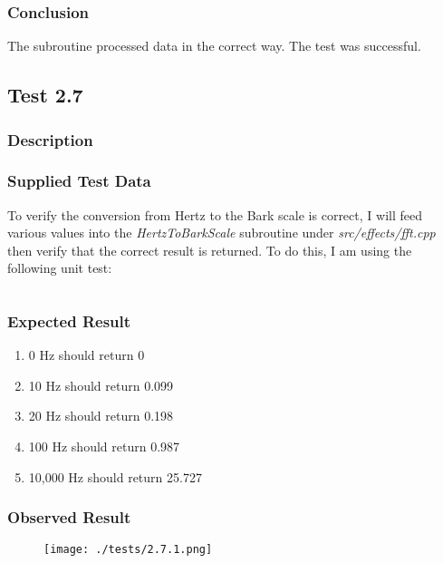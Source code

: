 \subsubsection*{Conclusion}
The subroutine processed data in the correct way. The test was successful.


\subsection{Test 2.7}
\subsubsection*{Description}
\paragraph{}
{
	\centering
}

\subsubsection*{Supplied Test Data}
To verify the conversion from Hertz to the Bark scale is correct, I will feed various values into the \textit{HertzToBarkScale} subroutine under \textit{src/effects/fft.cpp} then verify that the correct result is returned. To do this, I am using the following unit test:
\inputminted[linenos,firstline=3,lastline=25]{c++}{../unit_tests/scale.cpp}

\subsubsection*{Expected Result}
\begin{enumerate}
	\item 0 Hz should return 0
	\item 10 Hz should return 0.099
	\item 20 Hz should return 0.198
	\item 100 Hz should return 0.987
	\item 10,000 Hz should return 25.727
\end{enumerate}

\subsubsection*{Observed Result}
\label{sec:evidence2.7}
\begin{figure}[H]
	\texttt{[image: ./tests/2.7.1.png]}
\end{figure}

